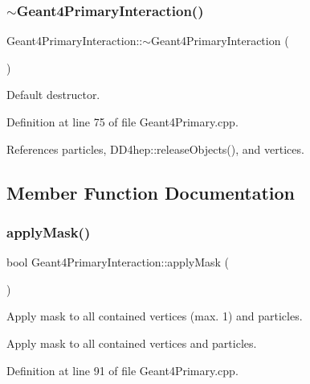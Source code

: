 \subsubsection{\texorpdfstring{$\sim$\+Geant4\+Primary\+Interaction()}{~Geant4PrimaryInteraction()}}
{\footnotesize\ttfamily Geant4\+Primary\+Interaction\+::$\sim$\+Geant4\+Primary\+Interaction (\begin{DoxyParamCaption}{ }\end{DoxyParamCaption})\hspace{0.3cm}{\ttfamily [virtual]}}



Default destructor. 



Definition at line 75 of file Geant4\+Primary.\+cpp.



References particles, D\+D4hep\+::release\+Objects(), and vertices.



\subsection{Member Function Documentation}
\hypertarget{class_d_d4hep_1_1_simulation_1_1_geant4_primary_interaction_adcf2faaa67296efa47035fb2c00719a6}{}\label{class_d_d4hep_1_1_simulation_1_1_geant4_primary_interaction_adcf2faaa67296efa47035fb2c00719a6} 
\subsubsection{\texorpdfstring{apply\+Mask()}{applyMask()}}
{\footnotesize\ttfamily bool Geant4\+Primary\+Interaction\+::apply\+Mask (\begin{DoxyParamCaption}{ }\end{DoxyParamCaption})}



Apply mask to all contained vertices (max. 1) and particles. 

Apply mask to all contained vertices and particles. 

Definition at line 91 of file Geant4\+Primary.\+cpp.



